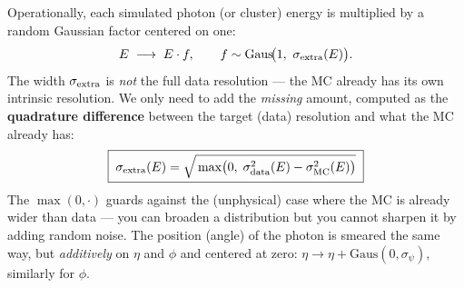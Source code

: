 \documentclass[11pt]{article}
\begin{document}
Operationally, each simulated photon (or cluster) energy is multiplied by a
random Gaussian factor centered on one:
\begin{equation}
  E \;\longrightarrow\; E\cdot f,\qquad
  f\sim \mathrm{Gaus}\!\big(1,\ \sigma_{\rm extra}(E)\big).
  \label{eq:smear}
\end{equation}
The width $\sigma_{\rm extra}$ is \emph{not} the full data resolution --- the MC
already has its own intrinsic resolution. We only need to add the
\emph{missing} amount, computed as the \textbf{quadrature difference} between the
target (data) resolution and what the MC already has:
\begin{equation}
  \boxed{\;\sigma_{\rm extra}(E)=\sqrt{\,\max\!\big(0,\;
  \sigma_{\rm data}^2(E)-\sigma_{\rm MC}^2(E)\big)}\;}
  \label{eq:quaddiff}
\end{equation}
The $\max(0,\cdot)$ guards against the (unphysical) case where the MC is already
wider than data --- you can broaden a distribution but you cannot sharpen it by
adding random noise. The position (angle) of the photon is smeared the same way,
but \emph{additively} on $\eta$ and $\phi$ and centered at zero:
$\eta\to\eta+\mathrm{Gaus}(0,\sigma_\psi)$, similarly for $\phi$.
\end{document}
